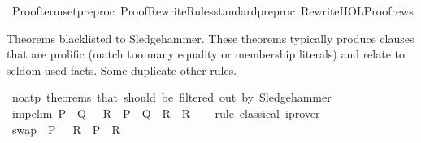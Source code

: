 \begin{isabellebody}
\ {\isacartoucheopen}Proofterm{\isachardot}{\kern0pt}set{\isacharunderscore}{\kern0pt}preproc\ {\isacharparenleft}{\kern0pt}Proof{\isacharunderscore}{\kern0pt}Rewrite{\isacharunderscore}{\kern0pt}Rules{\isachardot}{\kern0pt}standard{\isacharunderscore}{\kern0pt}preproc\ Rewrite{\isacharunderscore}{\kern0pt}HOL{\isacharunderscore}{\kern0pt}Proof{\isachardot}{\kern0pt}rews{\isacharparenright}{\kern0pt}{\isacartoucheclose}%
\endisatagML
{\isafoldML}%
%
\isadelimML
%
\endisadelimML
%
\isadelimdocument
%
\endisadelimdocument
%
\isatagdocument
%
\isamarkuptrue%
%
\endisatagdocument
{\isafolddocument}%
%
\isadelimdocument
%
\endisadelimdocument
%
\begin{isamarkuptext}%
Theorems blacklisted to Sledgehammer. These theorems typically produce clauses
  that are prolific (match too many equality or membership literals) and relate to
  seldom-used facts. Some duplicate other rules.%
\end{isamarkuptext}\isamarkuptrue%
\isamarkupfalse%
\ no{\isacharunderscore}{\kern0pt}atp\ {\isachardoublequoteopen}theorems\ that\ should\ be\ filtered\ out\ by\ Sledgehammer{\isachardoublequoteclose}%
\isadelimdocument
%
\endisadelimdocument
%
\isatagdocument
%
\isamarkuptrue%
%
\endisatagdocument
{\isafolddocument}%
%
\isadelimdocument
%
\endisadelimdocument
{}\isamarkupfalse%
\ imp{\isacharunderscore}{\kern0pt}elim{\isacharcolon}{\kern0pt}\ {\isachardoublequoteopen}P\ {\isasymlongrightarrow}\ Q\ {\isasymLongrightarrow}\ {\isacharparenleft}{\kern0pt}{\isasymnot}\ R\ {\isasymLongrightarrow}\ P{\isacharparenright}{\kern0pt}\ {\isasymLongrightarrow}\ {\isacharparenleft}{\kern0pt}Q\ {\isasymLongrightarrow}\ R{\isacharparenright}{\kern0pt}\ {\isasymLongrightarrow}\ R{\isachardoublequoteclose}\isanewline
%
\isadelimproof
\ \ %
\endisadelimproof
%
\isatagproof
{}\isamarkupfalse%
\ {\isacharparenleft}{\kern0pt}rule\ classical{\isacharparenright}{\kern0pt}\ iprover%
\endisatagproof
{\isafoldproof}%
%
\isadelimproof
\isanewline
%
\endisadelimproof
\isanewline
{}\isamarkupfalse%
\ swap{\isacharcolon}{\kern0pt}\ {\isachardoublequoteopen}{\isasymnot}\ P\ {\isasymLongrightarrow}\ {\isacharparenleft}{\kern0pt}{\isasymnot}\ R\ {\isasymLongrightarrow}\ P{\isacharparenright}{\kern0pt}\ {\isasymLongrightarrow}\ R{\isachardoublequoteclose}\isanewline
%
\isadelimproof
\ \ %
\endisadelimproof
%
\isatagproof
{}\isamarkupfalse%

\end{isabellebody}
